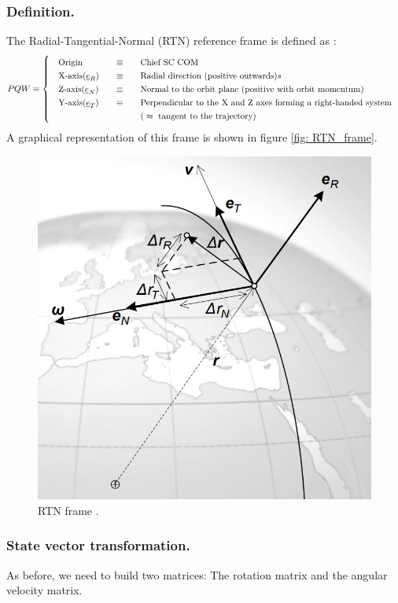		\subsubsection{Definition.}
		\indent The Radial-Tangential-Normal (RTN) reference frame is defined as \cite{dAmicoDLR}:
		\[
		\arraycolsep=10pt
		\def\arraystretch{1.3}
		PQW\equiv\left\{
		\begin{array}{lll}
		\text{Origin} 	& \equiv 	& \text{Chief SC COM} \\
		\text{X-axis}(\underline{e}_R) 	& \equiv 	& \text{Radial direction (positive outwards)}s \\
		\text{Z-axis}(\underline{e}_N) 	& \equiv 	& \text{Normal to the orbit plane (positive with orbit momentum)} \\
		\text{Y-axis}(\underline{e}_T) 	& \equiv 	& \text{Perpendicular to the X and Z axes forming a right-handed system} \\
									 	& 			& \text{(} \approx \text{ tangent to the trajectory)}
		\end{array}
		\right.
		\]
		\indent A graphical representation of this frame is shown in figure \ref{fig:	RTN_frame}.
		\begin{figure}[!htb]
		\centering\includegraphics[width = 0.4\linewidth]{Appendices/Appendix_B/RTN_frame}
		\caption{RTN frame \cite{dAmicoDLR}.}
		\label{fig:	RTN_frame}
		\end{figure}
		\FloatBarrier
		\subsubsection{State vector transformation.}
		\indent As before, we need to build two matrices: The rotation matrix and the angular velocity matrix. 
